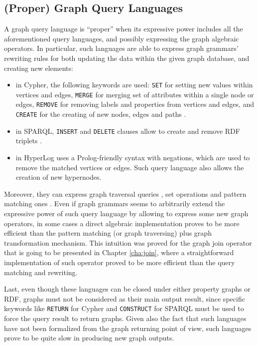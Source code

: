 
\subsection{(Proper) Graph Query Languages}\label{subsec:proper}
A graph query language is ``proper'' when its expressive power includes all the aforementioned query languages, and possibly expressing the graph algebraic operators. In particular, such languages are able to express graph grammars' rewriting rules for both updating the data within the given graph database, and creating new elements:
\begin{itemize}
	\item in Cypher, the following keywords are used: \texttt{SET} for setting new values within vertices and edges, \texttt{MERGE} for merging set of attributes within a single node or edges, \texttt{REMOVE} for removing labels and properties from vertices and edges, and \texttt{CREATE} for the creating of new nodes, edges and paths \cite{CypherCheat}.
	\item in SPARQL, \texttt{INSERT} and \texttt{DELETE} clauses allow to create and remove RDF triplets \cite{sparql11update2013}.
	\item in HyperLog \cite{poulovassilis2001} uses a Prolog-friendly syntax with negations, which are used to remove the matched vertices or edges. Such query language also allows the creation of new hypernodes.
\end{itemize} 
Moreover, they can express graph traversal queries \cite{Kostylev2015}, set operations and pattern matching ones \cite{JunghannsKAPR17}. Even if graph grammars seems to  arbitrarily extend the expressive power of such query language by allowing to express some new graph operators, in some cases a direct algebraic implementation proves to be more efficient than the pattern matching (or graph traversing) plus graph transformation mechanism. This intuition was proved for the graph join operator that is going to be presented in Chapter \vref{cha:join}, where a straightforward implementation of such operator proved to be more efficient than the query matching and rewriting.


Last, even though these languages can be closed under either property graphs or RDF, graphs must not be considered as their main output result, since specific keywords like  \texttt{RETURN} for Cypher and \texttt{CONSTRUCT} for SPARQL must be used to force the query result to return graphs. Given also the fact that such languages have not been formalized from the graph returning point of view, such languages prove to be quite slow in producing new graph outputs. 

